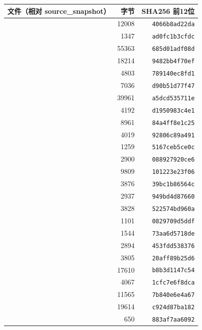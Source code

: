\begin{longtable}{P{91mm}rr}
\toprule 文件（相对 source\_snapshot） & 字节 & SHA256 前12位 \\ \midrule\endhead
{} & 12008 & \texttt{4066b8ad22da} \\
 & 1347 & \texttt{ad0fc1b3cfdc} \\
 & 55363 & \texttt{685d01adf08d} \\
 & 18214 & \texttt{9482bb4f70ef} \\
 & 4803 & \texttt{789140ec8fd1} \\
 & 7036 & \texttt{d90b51d77f47} \\
 & 39961 & \texttt{a5dcd535711e} \\
 & 4192 & \texttt{d1950983c4e1} \\
 & 8961 & \texttt{84a4ff8e1c25} \\
 & 4019 & \texttt{92806c89a491} \\
 & 1259 & \texttt{5167ceb5ce0c} \\
 & 2900 & \texttt{088927920ce6} \\
 & 9809 & \texttt{101223e23f06} \\
 & 3876 & \texttt{39bc1b86564c} \\
 & 2937 & \texttt{949bd4d87660} \\
 & 3828 & \texttt{522574bd960a} \\
 & 1101 & \texttt{0829709d5ddf} \\
 & 1544 & \texttt{73aa6d5718de} \\
 & 2894 & \texttt{453fdd538376} \\
 & 3805 & \texttt{20aff89b25d6} \\
 & 17610 & \texttt{b8b3d1147c54} \\
 & 4067 & \texttt{1cfc7e6f8dca} \\
 & 11565 & \texttt{7b840e6e4a67} \\
 & 19614 & \texttt{c924d87ba182} \\
 & 650 & \texttt{883af7aa6092} \\
\bottomrule\end{longtable}
